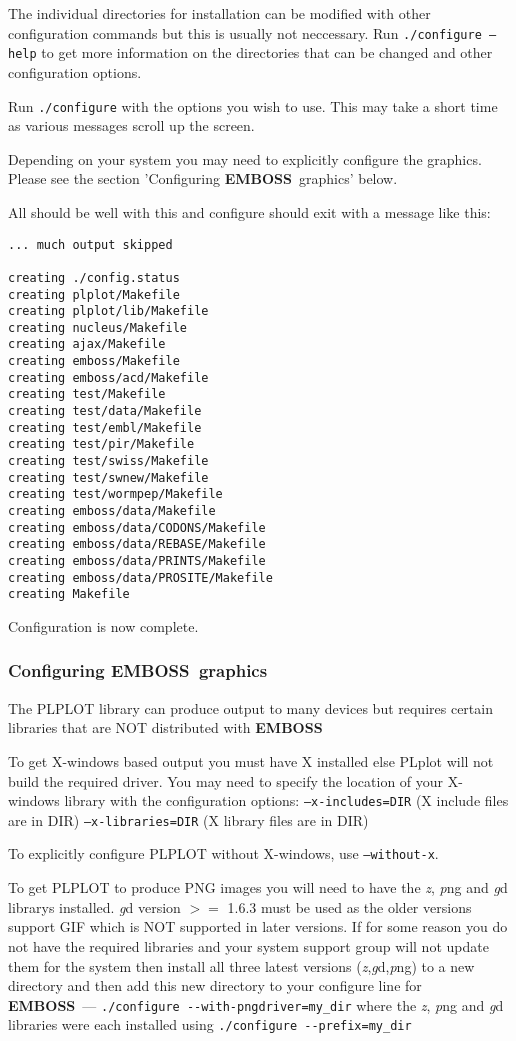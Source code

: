 \documentclass{report}
\newcommand{\ilcomm}[1]{{\tt #1}}
\newcommand{\filename}[1]{{\sf\textsl #1}}
\newcommand{\EMBOSS}{{\sf\bfseries EMBOSS}}
\begin{document}
The individual directories for installation can be modified with other configuration commands but this is usually not neccessary. Run \ilcomm{./configure --help} to get more information on the directories that can be changed and other configuration options.

Run \ilcomm{./configure} with the options you wish to use. This may take a short time as various messages scroll up the screen.

Depending on your system you may need to explicitly configure the graphics. Please see the section 'Configuring \EMBOSS\ graphics' below.

All should be well with this and configure should exit with a message like this:
\begin{verbatim}
... much output skipped

creating ./config.status
creating plplot/Makefile
creating plplot/lib/Makefile
creating nucleus/Makefile
creating ajax/Makefile
creating emboss/Makefile
creating emboss/acd/Makefile
creating test/Makefile
creating test/data/Makefile
creating test/embl/Makefile
creating test/pir/Makefile
creating test/swiss/Makefile
creating test/swnew/Makefile
creating test/wormpep/Makefile
creating emboss/data/Makefile
creating emboss/data/CODONS/Makefile
creating emboss/data/REBASE/Makefile
creating emboss/data/PRINTS/Makefile
creating emboss/data/PROSITE/Makefile
creating Makefile
\end{verbatim}
Configuration is now complete.

\subsubsection{Configuring \EMBOSS\ graphics}

The PLPLOT library can produce output to many devices but requires certain libraries that are NOT distributed with \EMBOSS

To get X-windows based output you must have X installed else PLplot will not build the
required driver. You may need to specify the location of your X-windows library with the configuration options:
  \ilcomm{--x-includes=DIR}        (X include files are in DIR)
  \ilcomm{--x-libraries=DIR}       (X library files are in DIR)

To explicitly configure PLPLOT without X-windows, use \ilcomm{--without-x}.



To get PLPLOT to produce PNG images you will need to have the \filename{z}, \filename{png} and \filename{gd}
librarys installed. \filename{gd} version $>=$  1.6.3 must be used as
the older versions support GIF which is NOT supported in later
versions.
If for some reason you do not have the required libraries and your 
system support group will not update them for the system then install all three latest versions (\filename{z},\filename{gd},\filename{png}) to a 
new directory and then add this new directory to your configure
line for \EMBOSS\ --- \verb+./configure --with-pngdriver=my_dir+
where the  \filename{z}, \filename{png} and \filename{gd} libraries were each installed using \verb+./configure --prefix=my_dir+ 
\end{document}
